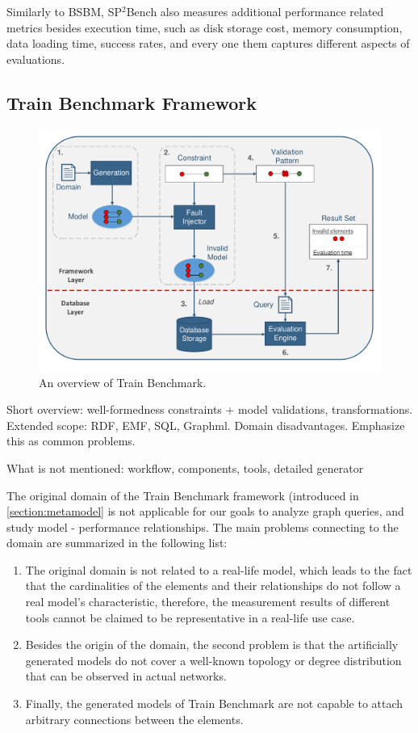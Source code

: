 Similarly to BSBM, SP$^2$Bench also measures additional performance related metrics besides execution time, such as disk storage cost, memory consumption, data loading time, success rates, and every one them captures different aspects of evaluations.


\subsection{Train Benchmark Framework}

\begin{figure}[!ht]
	\centering
	\includegraphics[width=150mm, keepaspectratio]{figures/functionality.pdf}
	\caption{An overview of Train Benchmark.}
	\label{fig:functionality}
\end{figure}

Short overview: well-formedness constraints + model validations, transformations.\\
Extended scope: RDF, EMF, SQL, Graphml.
Domain disadvantages. Emphasize this as common problems.

What is not mentioned: workflow, components, tools, detailed generator


The original domain of the Train Benchmark framework (introduced in \ref{section:metamodel} is not applicable for our goals to analyze graph queries, and study model - performance relationships. The main problems connecting to the domain are summarized in the following list:
\begin{enumerate}
	\item The original domain is not related to a real-life model, which leads to the fact that the cardinalities of the elements and their relationships do not follow a real model's characteristic, therefore, the measurement results of different tools cannot be claimed to be representative in a real-life use case. \label{item:railway_problem1}
	\item Besides the origin of the domain, the second problem is that the artificially generated models do not cover a well-known topology or degree distribution that can be observed in actual networks. \label{item:railway_problem2}
	\item Finally, the generated models of Train Benchmark are not capable to attach arbitrary connections between the elements. \label{item:railway_problem3}
\end{enumerate}

